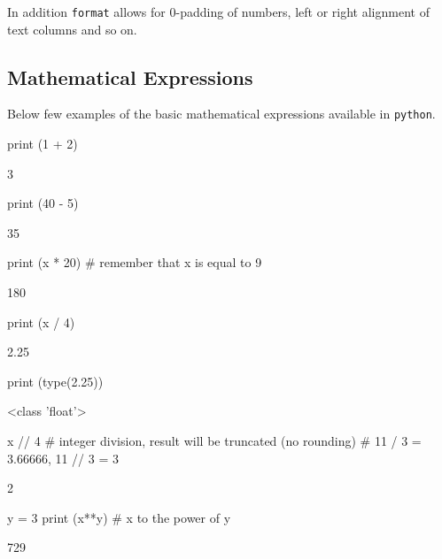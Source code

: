 In addition \texttt{format} allows for 0-padding of numbers, left or right alignment of text columns and so on.

\subsection{Mathematical Expressions}\label{mathematical-expressions}

Below few examples of the basic mathematical expressions available in \texttt{python}.

\begin{ipython}
print (1 + 2)	
\end{ipython}
\begin{ioutput}
3
\end{ioutput}

\begin{ipython}
print (40 - 5)	
\end{ipython}
\begin{ioutput}
35
\end{ioutput}

\begin{ipython}
print (x * 20) # remember that x is equal to 9
\end{ipython}
\begin{ioutput}
180	
\end{ioutput}

\begin{ipython}
print (x / 4)
\end{ipython}
\begin{ioutput}
2.25
\end{ioutput}

\begin{ipython}
print (type(2.25))
\end{ipython}
\begin{ioutput}
<class 'float'>	
\end{ioutput}

\begin{ipython}
x // 4 # integer division, result will be truncated (no rounding)
       # 11 / 3 = 3.66666, 11 // 3 = 3
\end{ipython}
\begin{ioutput}
2
\end{ioutput}

\begin{ipython}
y = 3
print (x**y) # x to the power of y 	
\end{ipython}
\begin{ioutput}
729
\end{ioutput}

